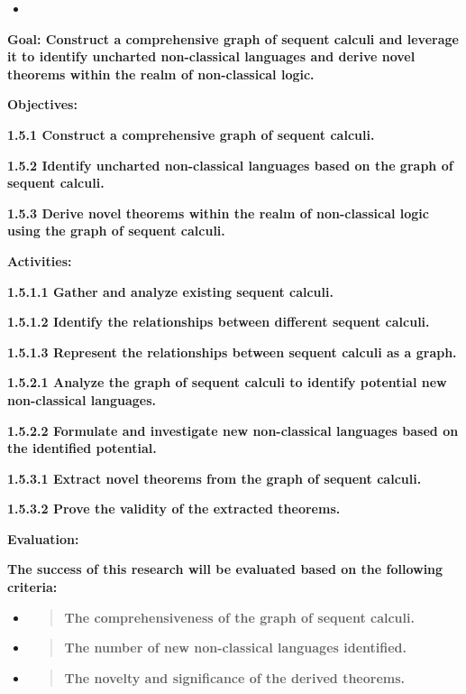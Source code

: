 \begin{itemize}
\tightlist
\item
\end{itemize}

\textbf{Goal: Construct a comprehensive graph of sequent calculi and
leverage it to identify uncharted non-classical languages and derive
novel theorems within the realm of non-classical logic.}

\textbf{Objectives:}

\textbf{1.5.1 Construct a comprehensive graph of sequent calculi.}

\textbf{1.5.2 Identify uncharted non-classical languages based on the
graph of sequent calculi.}

\textbf{1.5.3 Derive novel theorems within the realm of non-classical
logic using the graph of sequent calculi.}

\textbf{Activities:}

\textbf{1.5.1.1 Gather and analyze existing sequent calculi.}

\textbf{1.5.1.2 Identify the relationships between different sequent
calculi.}

\textbf{1.5.1.3 Represent the relationships between sequent calculi as a
graph.}

\textbf{1.5.2.1 Analyze the graph of sequent calculi to identify
potential new non-classical languages.}

\textbf{1.5.2.2 Formulate and investigate new non-classical languages
based on the identified potential.}

\textbf{1.5.3.1 Extract novel theorems from the graph of sequent
calculi.}

\textbf{1.5.3.2 Prove the validity of the extracted theorems.}

\textbf{Evaluation:}

\textbf{The success of this research will be evaluated based on the
following criteria:}

\begin{itemize}
\item
  \begin{quote}
  \textbf{The comprehensiveness of the graph of sequent calculi.\\
  }
  \end{quote}
\item
  \begin{quote}
  \textbf{The number of new non-classical languages identified.\\
  }
  \end{quote}
\item
  \begin{quote}
  \textbf{The novelty and significance of the derived theorems.\\
  }
  \end{quote}
\end{itemize}

